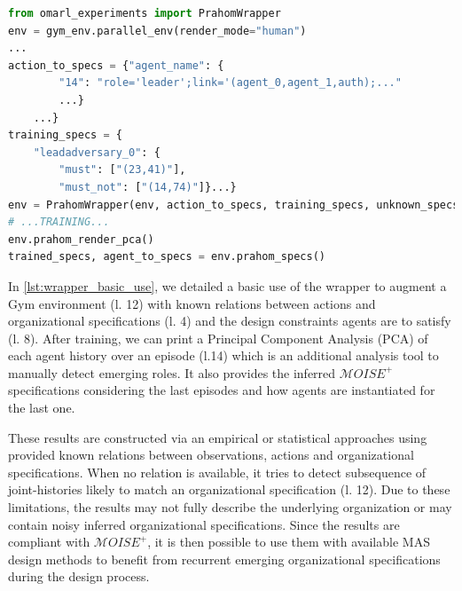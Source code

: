 \documentclass[runningheads]{llncs}
\newcounter{relation}
\begin{document}
\begin{lstlisting}[language=Python, caption=PRAHOM Gym Wrapper basic use, label={lst:wrapper_basic_use}]
from omarl_experiments import PrahomWrapper
env = gym_env.parallel_env(render_mode="human")
...
action_to_specs = {"agent_name": {
        "14": "role='leader';link='(agent_0,agent_1,auth);..."
        ...}    
    ...}
training_specs = {
    "leadadversary_0": {
        "must": ["(23,41)"],
        "must_not": ["(14,74)"]}...}
env = PrahomWrapper(env, action_to_specs, training_specs, unknown_specs_inference=True, pca_output=True)
# ...TRAINING...
env.prahom_render_pca()
trained_specs, agent_to_specs = env.prahom_specs()
\end{lstlisting}

In \autoref{lst:wrapper_basic_use}, we detailed a basic use of the wrapper to augment a Gym environment (l. 12) with known relations between actions and organizational specifications (l. 4) and the design constraints agents are to satisfy (l. 8). After training, we can print a Principal Component Analysis (PCA) of each agent history over an episode (l.14) which is an additional analysis tool to manually detect emerging roles. It also provides the inferred $\mathcal{M}OISE^+$ specifications considering the last episodes and how agents are instantiated for the last one.

These results are constructed via an empirical or statistical approaches using provided known relations between observations, actions and organizational specifications. When no relation is available, it tries to detect subsequence of joint-histories likely to match an organizational specification (l. 12). Due to these limitations, the results may not fully describe the underlying organization or may contain noisy inferred organizational specifications. Since the results are compliant with $\mathcal{M}OISE^+$, it is then possible to use them with available MAS design methods to benefit from recurrent emerging organizational specifications during the design process.



\end{document}
